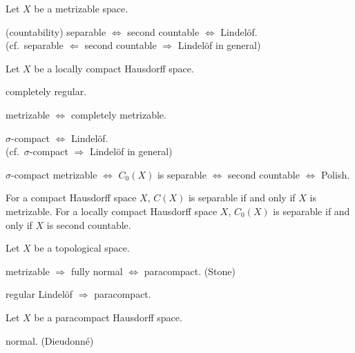 \documentclass{../../large}
\begin{document}
\begin{prb}
Let $X$ be a metrizable space.
\begin{parts}
\item (countability) separable $\Leftrightarrow$ second countable $\Leftrightarrow$ Lindel\"of.\\
(cf.~separable $\Leftarrow$ second countable $\Rightarrow$ Lindel\"of in general)
\end{parts}
\end{prb}


\begin{prb}
Let $X$ be a locally compact Hausdorff space.
\begin{parts}
\item completely regular.
\item metrizable $\Leftrightarrow$ completely metrizable.
\item $\sigma$-compact $\Leftrightarrow$ Lindel\"of.\\
(cf.~$\sigma$-compact $\Rightarrow$ Lindel\"of in general)
\item $\sigma$-compact metrizable $\Leftrightarrow$ $C_0(X)$ is separable $\Leftrightarrow$ second countable $\Leftrightarrow$ Polish.
\end{parts}
\end{prb}

For a compact Hausdorff space $X$, $C(X)$ is separable if and only if $X$ is metrizable.
For a locally compact Hausdorff space $X$, $C_0(X)$ is separable if and only if $X$ is second countable.


\begin{prb}
Let $X$ be a topological space.
\begin{parts}
\item metrizable $\Rightarrow$ fully normal $\Leftrightarrow$ paracompact. (Stone)
\item regular Lindel\"of $\Rightarrow$ paracompact.
\end{parts}
\end{prb}

\begin{prb}
Let $X$ be a paracompact Hausdorff space.
\begin{parts}
\item normal. (Dieudonn\'e)
\item
\end{parts}
\end{prb}
\end{document}

